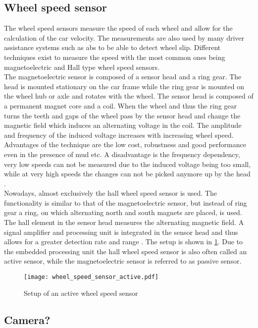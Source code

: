 \subsection{Wheel speed sensor}
The wheel speed sensors measure the speed of each wheel and allow for the calculation of the car velocity.
The measurements are also used by many driver assistance systems such as \gls{abs} to be able to detect wheel slip.
Different techniques exist to measure the speed with the most common ones being magnetoelectric and Hall type wheel speed sensors.\\
The magnetoelectric sensor is composed of a sensor head and a ring gear.
The head is mounted stationary on the car frame while the ring gear is mounted on the wheel hub or axle and rotates with the wheel.
The sensor head is composed of a permanent magnet core and a coil.
When the wheel and thus the ring gear turns the teeth and gaps of the wheel pass by the sensor head and change the magnetic field which induces an alternating voltage in the coil.
The amplitude and frequency of the induced voltage increases with increasing wheel speed.
Advantages of the technique are the low cost, robustness and good performance even in the presence of mud etc.
A disadvantage is the frequency dependency, very low speeds can not be measured due to the induced voltage being too small, while at very high speeds the changes can not be picked anymore up by the head \cite{AutoReif2014}.\\
Nowadays, almost exclusively the hall wheel speed sensor is used.
The functionality is similar to that of the magnetoelectric sensor, but instead of ring gear a ring, on which alternating north and south magnets are placed, is used.
The hall element in the sensor head measures the alternating magnetic field.
A signal amplifier and processing unit is integrated in the sensor head and thus allows for a greater detection rate and range \cite{Re2011}.
The setup is shown in \cref{fig:wheel_speed_sensor_active}.
Due to the embedded processing unit the hall wheel speed sensor is also often called an active sensor, while the magnetoelectric sensor is referred to as passive sensor.
\begin{figure}[htbp]
    \centering
    \texttt{[image: wheel\_speed\_sensor\_active.pdf]}
    \caption{Setup of an active wheel speed sensor \cite{Re2011}}
    \label{fig:wheel_speed_sensor_active}
\end{figure}


\subsection{Camera?}




